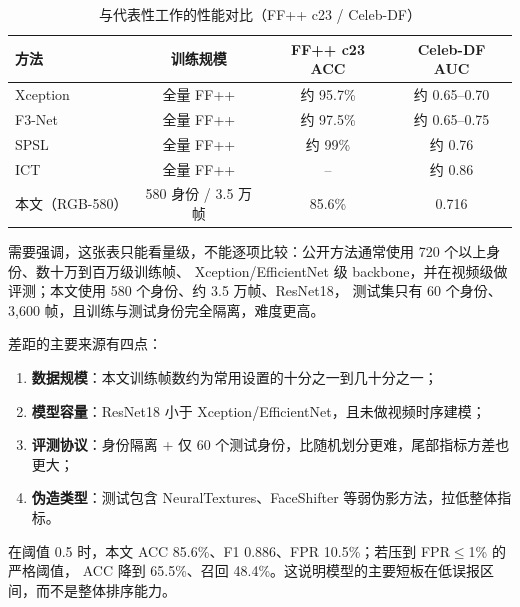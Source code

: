 \begin{table}[H]
\centering
\caption{与代表性工作的性能对比（FF++ c23 / Celeb-DF）}
\label{tab:gap}
\small
\begin{tabular}{lccc}
\toprule
方法 & 训练规模 & FF++ c23 ACC & Celeb-DF AUC \\
\midrule
Xception\cite{rossler2019ffpp} & 全量 FF++ & 约 95.7\% & 约 0.65--0.70 \\
F3-Net\cite{qian2020f3net} & 全量 FF++ & 约 97.5\% & 约 0.65--0.75 \\
SPSL\cite{liu2021spsl} & 全量 FF++ & 约 99\% & 约 0.76 \\
ICT\cite{dong2022ict} & 全量 FF++ & -- & 约 0.86 \\
\midrule
本文（RGB-580） & 580 身份 / 3.5 万帧 & 85.6\% & 0.716 \\
\bottomrule
\end{tabular}
\end{table}

需要强调，这张表只能看量级，不能逐项比较：公开方法通常使用 720 个以上身份、数十万到百万级训练帧、
Xception/EfficientNet 级 backbone，并在视频级做评测；本文使用 580 个身份、约 3.5 万帧、ResNet18，
测试集只有 60 个身份、3,600 帧，且训练与测试身份完全隔离，难度更高。

差距的主要来源有四点：

\begin{enumerate}
  \item \textbf{数据规模}：本文训练帧数约为常用设置的十分之一到几十分之一；
  \item \textbf{模型容量}：ResNet18 小于 Xception/EfficientNet，且未做视频时序建模；
  \item \textbf{评测协议}：身份隔离 + 仅 60 个测试身份，比随机划分更难，尾部指标方差也更大；
  \item \textbf{伪造类型}：测试包含 NeuralTextures、FaceShifter 等弱伪影方法，拉低整体指标。
\end{enumerate}

在阈值 0.5 时，本文 ACC 85.6\%、F1 0.886、FPR 10.5\%；若压到 FPR$\le$1\% 的严格阈值，
ACC 降到 65.5\%、召回 48.4\%。这说明模型的主要短板在低误报区间，而不是整体排序能力。

